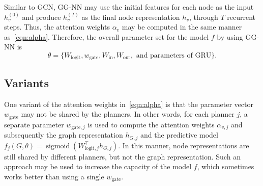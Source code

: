 \documentclass[letterpaper]{article} %
\DeclareMathOperator{\sigmoid}{sigmoid}
\begin{document}
Similar to GCN, GG-NN may use the initial features for each node as the input $h_v^{(0)}$ and produce $h_v^{(T)}$ as the final node representation $h_v$, through $T$ recurrent steps. Thus, the attention weights $\alpha_v$ may be computed in the same manner as~\eqref{eqn:alpha}. Therefore, the overall parameter set for the model $f$ by using GG-NN is
\[
\theta=\{W_{\text{logit}}, w_{\text{gate}}, W_{\text{in}}, W_{\text{out}}, \text{ and parameters of GRU}\}.
\]


\subsection{Variants}

One variant of the attention weights in~\eqref{eqn:alpha} is that the parameter vector $w_{\text{gate}}$ may not be shared by the planners. In other words, for each planner $j$, a separate parameter $w_{\text{gate},j}$ is used to compute the attention weights $\alpha_{v,j}$ and subsequently the graph representation $h_{G,j}$ and the predictive model $f_j(G,\theta)=\sigmoid(W_{\text{logit},j}^{\top}h_{G,j})$. In this manner, node representations are still shared by different planners, but not the graph representation. Such an approach may be used to increase the capacity of the model $f$, which sometimes works better than using a single $w_{\text{gate}}$.



\end{document}
